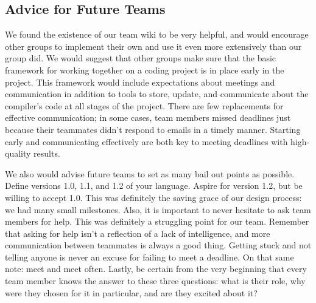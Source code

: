 \subsection{Advice for Future Teams}
We found the existence of our team wiki to be very helpful, and would
encourage other groups to implement their own and use it even more
extensively than our group did. We would suggest that other groups
make sure that the basic framework for working together on a coding
project is in place early in the project. This framework would include
expectations about meetings and communication in addition to tools to
store, update, and communicate about the compiler’s code at all stages
of the project. There are few replacements for effective
communication; in some cases, team members missed deadlines just
because their teammates didn't respond to emails in a timely
manner. Starting early and communicating effectively are both key to
meeting deadlines with high-quality results.

We also would advise future teams to set as many bail out points as
possible. Define versions 1.0, 1.1, and 1.2 of your language. Aspire
for version 1.2, but be willing to accept 1.0. This was definitely the
saving grace of our design process: we had many small
milestones. Also, it is important to never hesitate to ask team
members for help. This was definitely a struggling point for our
team. Remember that asking for help isn’t a reflection of a lack of
intelligence, and more communication between teammates is always a
good thing. Getting stuck and not telling anyone is never an excuse
for failing to meet a deadline. On that same note: meet and meet
often. Lastly, be certain from the very beginning that every team
member knows the answer to these three questions: what is their role,
why were they chosen for it in particular, and are they excited about
it?

